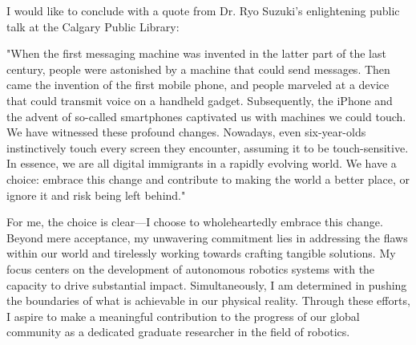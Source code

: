 \documentclass{article}
\begin{document}
I would like to conclude with a quote from Dr. Ryo Suzuki's enlightening public talk at the Calgary Public Library:

"When the first messaging machine was invented in the latter part of the last century, people were astonished 
by a machine that could send messages. Then came the invention of the first mobile phone, 
and people marveled at a device that could transmit voice on a handheld gadget. Subsequently, 
the iPhone and the advent of so-called smartphones captivated us with machines we could touch. 
We have witnessed these profound changes. Nowadays, even six-year-olds instinctively touch every screen they encounter, 
assuming it to be touch-sensitive. In essence, we are all digital immigrants in a rapidly evolving world. We have a choice: 
embrace this change and contribute to making the world a better place, or ignore it and risk being left behind."

For me, the choice is clear—I choose to wholeheartedly embrace this change.
Beyond mere acceptance, my unwavering commitment lies in addressing the flaws within our world 
and tirelessly working towards crafting tangible solutions.
My focus centers on the development of autonomous robotics systems with the capacity to 
drive substantial impact. Simultaneously, I am determined in pushing the boundaries of what is 
achievable in our physical reality. Through these efforts, I aspire to make a meaningful contribution 
to the progress of our global community as a dedicated graduate researcher in the field of robotics.

\printbibliography
\end{document}
